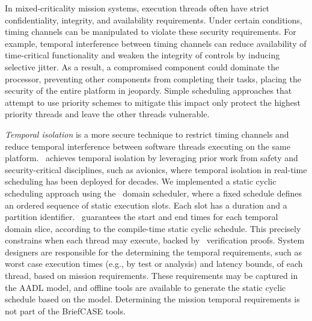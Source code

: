 
In mixed-criticality mission systems,
execution threads often 
have strict confidentiality, integrity, and availability requirements. 
Under certain conditions,
timing channels can be manipulated to violate these security requirements. 
For example, temporal interference between timing channels
can reduce availability of time-critical functionality 
and weaken the integrity of controls by inducing selective jitter.
As a result, a compromised component could dominate the processor, 
preventing other components from completing their tasks, placing the security 
of the entire platform in jeopardy. 
Simple scheduling approaches that attempt to use priority schemes to mitigate 
this impact only protect the highest priority threads and leave the other
threads vulnerable.

\emph{Temporal isolation} is a more secure technique to restrict timing channels and
reduce temporal interference between software threads executing on the same platform. 
\briefcase\ achieves temporal isolation by leveraging
prior work from safety and security-critical disciplines, such as
avionics, where temporal isolation in real-time scheduling has been
deployed for decades.
We implemented a static cyclic scheduling
approach using the \selFour\ domain scheduler, where a fixed schedule
defines an ordered sequence of static execution slots. Each slot has a
duration and a partition identifier.  
\selFour\ guarantees the start and end times for each temporal domain slice, according to the
compile-time static cyclic schedule. This precisely constrains when each thread may execute, backed
by \selFour\ verification proofs. System designers are responsible for the determining the temporal
requirements, such as worst case execution times (e.g., by test or analysis) and latency bounds, of
each thread, based on mission requirements. These requirements may be captured in the AADL model,
and offline tools are available to generate the static cyclic schedule based on the model.
Determining the mission temporal requirements is not part of the BriefCASE tools.

